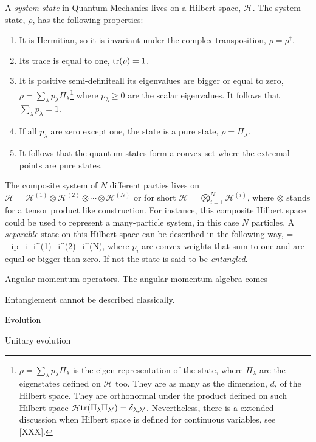 A \emph{system state} in Quantum Mechanics lives on a Hilbert space, $\mathcal{H}$.
The system state, $\rho$, has the following properties:
\begin{enumerate}
  \item
  It is Hermitian, so it is invariant under the complex transposition, $\rho=\rho^\dagger$.
  \item Its trace is equal to one, $\operatorname{tr}(\rho)=1$.
  \item It is positive semi-definite\ie all its eigenvalues are bigger or equal to zero, $\rho=\sum_{\lambda}p_\lambda \Pi_\lambda$\footnote{
    $\rho=\sum_{\lambda}p_\lambda \Pi_{\lambda}$ is the eigen-representation of the state, where $\Pi_{\lambda}$ are the eigenstates defined on $\mathcal{H}$ too.
    They are as many as the dimension, $d$, of the Hilbert space.
    They are orthonormal under the product defined on such Hilbert space $\mathcal{H}$\ie $\operatorname{tr}(\Pi_{\lambda}\Pi_{\lambda'})=\delta_{\lambda,\lambda'}$.
    Nevertheless, there is a extended discussion when Hilbert space is defined for continuous variables, see [XXX].
  } where $p_\lambda\geq 0$ are the scalar eigenvalues.
  It follows that $\sum_\lambda p_\lambda = 1$.
  \item If all $p_\lambda$ are zero except one, the state is a pure state, $\rho=\Pi_\lambda$.
  \item It follows that the quantum states form a convex set where the extremal points are pure states.
\end{enumerate}


The composite system of $N$ different parties lives on $\mathcal{H} = \mathcal{H}^{(1)}\otimes\mathcal{H}^{(2)}\otimes\cdots\otimes\mathcal{H}^{(N)}$ or for short $\mathcal{H} = \bigotimes_{i=1}^N\mathcal{H}^{(i)}$, where $\otimes$ stands for a tensor product like construction.
For instance, this composite Hilbert space could be used to represent a many-particle system, in this case $N$ particles.
A \emph{separable} state on this Hilbert space can be described in the following way,
\be
  \rho = \sum_{i}p_i\rho_i^{(1)}\otimes\rho_i^{(2)}\otimes\cdots\otimes\rho_i^{(N)},
\ee
where $p_i$ are convex weights that sum to one and are equal or bigger than zero.
If not the state is said to be \emph{entangled}.


Angular momentum operators.
The angular momentum algebra comes

Entanglement cannot be described classically.

Evolution

Unitary evolution

